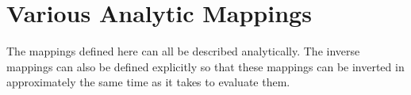 \section{Various Analytic Mappings}

The mappings defined here can all be described analytically. The inverse
mappings can also be defined explicitly so that these mappings can
be inverted in approximately the same time as it takes to evaluate
them.












